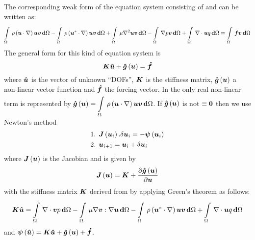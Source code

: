 The corresponding weak form of the equation system consisting of
 and 
can be written as:
\begin{equation}
  \gint{\Omega}{}{\rho\pbrac{\dotprod{\vectr{u}}{\grad}}\vectr{u}\vectr{v} }{\Omega}
  -\gint{\Omega}{}{\rho\pbrac{\dotprod{\vectr{u}^*}{\grad}}\vectr{u}\vectr{v} }{\Omega}
  +\gint{\Omega}{}{\mu\laplacian{}{\vectr{u}}\vectr{v}}{\Omega}
  -\gint{\Omega}{}{\gradient{}{p}\vectr{v}}{\Omega}
  +\gint{\Omega}{}{\divergence{}{\vectr{u}}q}{\Omega}=
  \gint{\Omega}{}{\vectr{f}\vectr{v}}{\Omega}  
  \label{eqn:NavierStokesweakform}
\end{equation}
The general form for this kind of equation system is
\begin{equation}
  \matr{K}{\vect{\hat{u}}}+
  \fnof{\vect{\hat{g}}}{{\vect{{u}}}}={\vect{\hat{f}}}
  \label{eqn:NavierStokesequationALE2general}
\end{equation}
where ${\vect{\hat{u}}}$ is the vector of unknown ``DOFs'', $\matr{K}$ is the
stiffness matrix, $\fnof{\vect{\hat{g}}}{{\vect{{u}}}}$ a non-linear vector
function and ${\vect{\hat{f}}}$ the forcing vector. In
 the only real non-linear term is represented
by
$\fnof{\vect{\hat{g}}}{\vect{{u}}}=\gint{\Omega}{}{\rho\pbrac{\dotprod{\vectr{u}}{\grad}}\vectr{u}\vectr{v}
}{\Omega}$.  If $\fnof{\vect{\hat{g}}}{\vect{u}}$ is not $\equiv\vect{0}$ then
we use Newton's method \ie
\begin{equation}
  \begin{split}
    \text{1.  } & \fnof{\matr{J}}{\vect{u}_{i}}.\delta
    \vect{u}_{i} = 
    -\fnof{\vect{\psi}}{\vectr{u}_{i}} \\
    \text{2.  } & \vect{u}_{i+1}=\vect{u}_{i}+\delta
    \vect{u}_{i}
  \end{split}
\end{equation}
where $\fnof{\matr{J}}{\vect{u}}$ is the Jacobian and is given by
\begin{equation}
  \fnof{\matr{J}}{\vect{u}}=\matr{K}+
    \delby{\fnof{\vect{\hat{g}}}{\vect{u}}}{\vect{u}}
\end{equation}
with the stiffness matrix $\matr{K}$ derived from
 by applying Green's theorem as
follows:
\begin{equation}
  \begin{split}
  \matr{K}\vectr{\hat{u}}=
  \gint{\Omega}{}{\divergence{}{\vectr{v}}p}{\Omega}
  -\gint{\Omega}{}{\doubledotprod{\mu\gradient{}{\vectr{v}}}{\gradient{}{\vectr{u}}}}{\Omega}
  -\gint{\Omega}{}{\rho\pbrac{\dotprod{\vectr{u}^*}{\grad}}\vectr{u}\vectr{v}}{\Omega}
  +\gint{\Omega}{}{\divergence{}{\vectr{u}}q}{\Omega}
  \end{split}
  \label{eqn:NavierStokesweakform2}
\end{equation}
and $\fnof{\vect{\psi}}{\vect{\hat{u}}}=\matr{K}\vect{\hat{u}}+\fnof{\vect{\hat{g}}}{\vect{u}}+\vect{\hat{f}}$.


